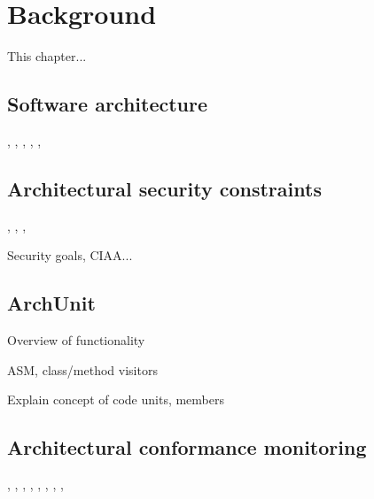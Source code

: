 \chapter{Background}

This chapter...

\section{Software architecture}
\cite{ambriola_introduction_1993}, \cite{jansen_software_2005}, \cite{bass_software_2013}, \cite{scandariato_architecting_2009}, \cite{nguyen_sospa_2015}, 

\section{Architectural security constraints}
\cite{broy_software_2007}, \cite{felderer_security_2016}, \cite{haley_security_2008}, 

Security goals, CIAA...

\section{ArchUnit}\label{archunit-back-section}

Overview of functionality

ASM, class/method visitors

Explain concept of code units, members

\section{Architectural conformance monitoring}
\cite{aldrich_archjava_2002}, \cite{abi-antoun_analyzing_2010}, \cite{luckham_event-based_1995}, \cite{abi-antoun_static_2009}, \cite{de_silva_controlling_2012}, \cite{knodel_comparison_2007}, \cite{jansen_documenting_2008}, \cite{hong_yan_discotect_2004}, 



